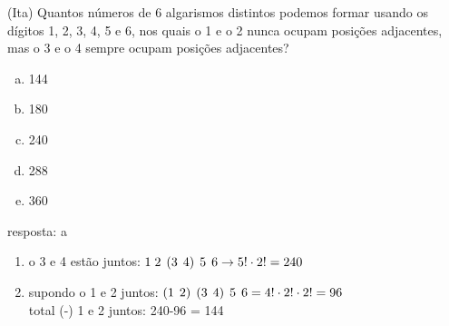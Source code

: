 \begin{ex}
 (Ita) Quantos números de 6 algarismos distintos podemos formar usando os dígitos 1, 2, 3, 4, 5 e 6, nos quais o 1 e o 2 nunca ocupam posições adjacentes, mas o 3 e o 4 sempre ocupam posições adjacentes?
    \begin{enumerate}[(a)]
    \item 144
    \item 180
    \item 240
    \item 288
    \item 360
    \end{enumerate}
      \begin{sol}
       resposta: a
       \begin{enumerate} [--]
           \item o 3 e 4 estão juntos: $1\hspace{0.1cm} 2\hspace{0.15cm}  (3\hspace{0.15cm}  4)\hspace{0.15cm} 5\hspace{0.15cm}  6\rightarrow 5!\cdot2!=240$
           \item supondo o 1 e 2 juntos: $(1\hspace{0.15cm}2)\hspace{0.15cm}(3\hspace{0.15cm}4)\hspace{0.15cm} 5\hspace{0.15cm}6=4!\cdot2!\cdot2!=96$\\
           total (-) 1 e 2  juntos:
           240-96 = 144
       \end{enumerate}    
      \end{sol}
\end{ex}